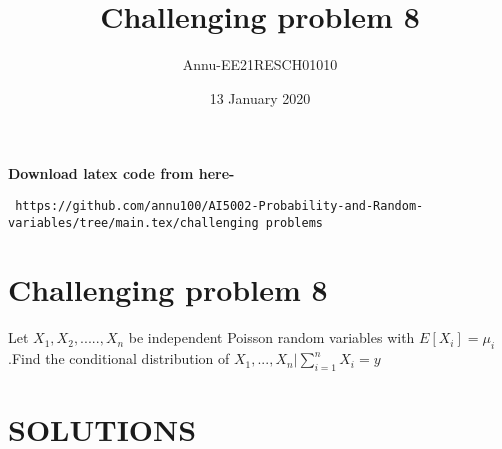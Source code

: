 \documentclass[journel,12pt,twocoloums]{IEEEtran}
\title{Challenging problem 8}
\author{Annu-EE21RESCH01010}
\date{13 January 2020}
\providecommand{\mean}[1]{E[ #1 ]}
\begin{document}
 \maketitle
\textbf{Download latex code from here-}\\
\begin{lstlisting}
 https://github.com/annu100/AI5002-Probability-and-Random-variables/tree/main.tex/challenging problems
 \end{lstlisting}

 \section{Challenging problem 8}


Let $X_1,X_2,.....,X_n$ be independent Poisson random variables with $\mean{X_i}=\mu_i$.Find the conditional distribution of $X_1,...,X_n\biggr\vert\sum_{i=1}^{n}X_i=y$

\section{SOLUTIONS}
\end{document}
